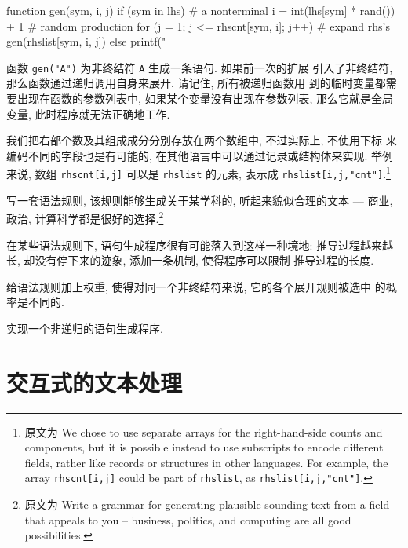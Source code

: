 {\begin{awkcode}
    function gen(sym,    i, j) {
        if (sym in lhs) {       # a nonterminal
            i = int(lhs[sym] * rand()) + 1   # random production
            for (j = 1; j <= rhscnt[sym, i]; j++) # expand rhs's
                gen(rhslist[sym, i, j])
        } else
            printf("%
    }
\end{awkcode}

函数 \texttt{gen("A")} 为非终结符 \texttt{A} 生成一条语句. 如果前一次的扩展
引入了非终结符, 那么函数通过递归调用自身来展开. 请记住, 所有被递归函数用
到的临时变量都需要出现在函数的参数列表中, 如果某个变量没有出现在参数列表,
那么它就是全局变量, 此时程序就无法正确地工作.

我们把右部个数及其组成成分分别存放在两个数组中, 不过实际上, 不使用下标
来编码不同的字段也是有可能的, 在其他语言中可以通过记录或结构体来实现. 
举例来说, 数组 \texttt{rhscnt[i,j]} 可以是 \texttt{rhslist} 的元素,
表示成 \texttt{rhslist[i,j,"cnt"]}.\footnote{原文为 We chose to use
    separate arrays for the right-hand-side counts and components, but it
    is possible instead to use subscripts to encode different fields,
    rather like records or structures in other languages. For example, the
    array \texttt{rhscnt[i,j]} could be part of \texttt{rhslist}, as
    \texttt{rhslist[i,j,"cnt"]}.}

\begin{exercise}
    写一套语法规则, 该规则能够生成关于某学科的, 听起来貌似合理的文本 ---
    商业, 政治, 计算科学都是很好的选择.\footnote{原文为 Write a grammar for
        generating plausible-sounding text from a field that appeals to you
    -- business, politics, and computing are all good possibilities.}
\end{exercise}

\begin{exercise}
    在某些语法规则下, 语句生成程序很有可能落入到这样一种境地:
    推导过程越来越长, 却没有停下来的迹象, 添加一条机制, 使得程序可以限制
    推导过程的长度.
\end{exercise}

\begin{exercise}
    给语法规则加上权重, 使得对同一个非终结符来说, 它的各个展开规则被选中
    的概率是不同的.
\end{exercise}

\begin{awkcode}
    实现一个非递归的语句生成程序.
\end{awkcode}

\section{交互式的文本处理}
\label{sec:interactive_text_manipulation}

}
